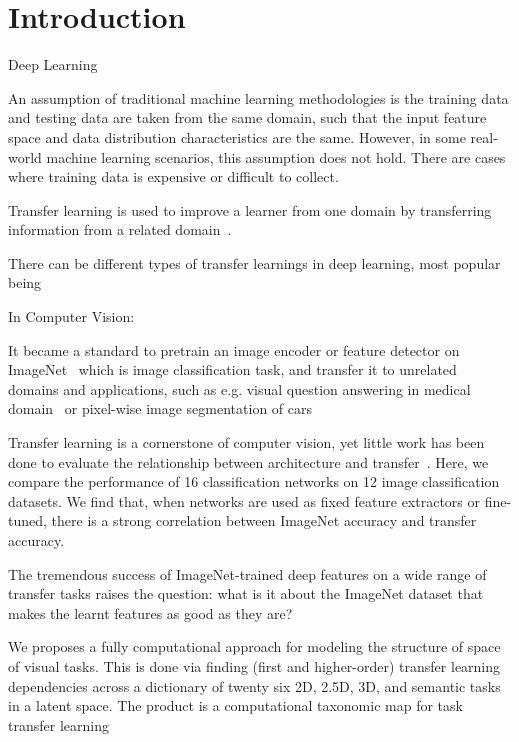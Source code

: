 \section{Introduction}

Deep Learning~\cite{lecun2015deep}

An assumption of traditional machine learning methodologies is the training data and testing data are taken from the same domain, such that the input feature space and data distribution characteristics are the same. However, in some real-world machine learning scenarios, this assumption does not hold. There are cases where training data is expensive or difficult to collect.

Transfer learning is used to improve a learner from one domain by transferring information from a related domain~\cite{pan2009survey}.

There can be  different types of transfer learnings in deep learning,
most popular being 

In Computer Vision:

It became a standard to pretrain an image encoder or feature detector on ImageNet~\cite{deng2009imagenet} which is image classification task, and transfer it to unrelated domains and applications, such as e.g. visual question answering in medical domain~\cite{kornuta2019leveraging} or pixel-wise image segmentation of cars~\cite{iglovikov2018ternausnet}


Transfer learning is a cornerstone of computer vision,
yet little work has been done to evaluate the relationship
between architecture and transfer~\cite{kornblith2019better}.
Here, we compare the performance of 16 classification networks on 12 image classification datasets. We find that, when networks are used as fixed feature extractors or fine-tuned, there is a strong correlation between ImageNet accuracy and transfer accuracy.


The tremendous success of ImageNet-trained deep features on a wide range of transfer tasks raises the question:
what is it about the ImageNet dataset that makes the learnt
features as good as they are?~\cite{huh2016makes}

We proposes a fully computational approach for modeling the structure of space of visual tasks. This is done via
finding (first and higher-order) transfer learning dependencies across a dictionary of twenty six 2D, 2.5D, 3D, and
semantic tasks in a latent space. The product is a computational taxonomic map for task transfer learning~\cite{zamir2018taskonomy}

